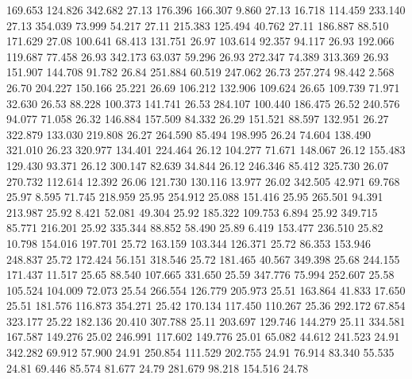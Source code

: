  169.653  124.826  342.682        27.13
 176.396  166.307    9.860        27.13
  16.718  114.459  233.140        27.13
 354.039   73.999   54.217        27.11
 215.383  125.494   40.762        27.11
 186.887   88.510  171.629        27.08
 100.641   68.413  131.751        26.97
 103.614   92.357   94.117        26.93
 192.066  119.687   77.458        26.93
 342.173   63.037   59.296        26.93
 272.347   74.389  313.369        26.93
 151.907  144.708   91.782        26.84
 251.884   60.519  247.062        26.73
 257.274   98.442    2.568        26.70
 204.227  150.166   25.221        26.69
 106.212  132.906  109.624        26.65
 109.739   71.971   32.630        26.53
  88.228  100.373  141.741        26.53
 284.107  100.440  186.475        26.52
 240.576   94.077   71.058        26.32
 146.884  157.509   84.332        26.29
 151.521   88.597  132.951        26.27
 322.879  133.030  219.808        26.27
 264.590   85.494  198.995        26.24
  74.604  138.490  321.010        26.23
 320.977  134.401  224.464        26.12
 104.277   71.671  148.067        26.12
 155.483  129.430   93.371        26.12
 300.147   82.639   34.844        26.12
 246.346   85.412  325.730        26.07
 270.732  112.614   12.392        26.06
 121.730  130.116   13.977        26.02
 342.505   42.971   69.768        25.97
   8.595   71.745  218.959        25.95
 254.912   25.088  151.416        25.95
 265.501   94.391  213.987        25.92
   8.421   52.081   49.304        25.92
 185.322  109.753    6.894        25.92
 349.715   85.771  216.201        25.92
 335.344   88.852   58.490        25.89
   6.419  153.477  236.510        25.82
  10.798  154.016  197.701        25.72
 163.159  103.344  126.371        25.72
  86.353  153.946  248.837        25.72
 172.424   56.151  318.546        25.72
 181.465   40.567  349.398        25.68
 244.155  171.437   11.517        25.65
  88.540  107.665  331.650        25.59
 347.776   75.994  252.607        25.58
 105.524  104.009   72.073        25.54
 266.554  126.779  205.973        25.51
 163.864   41.833   17.650        25.51
 181.576  116.873  354.271        25.42
 170.134  117.450  110.267        25.36
 292.172   67.854  323.177        25.22
 182.136   20.410  307.788        25.11
 203.697  129.746  144.279        25.11
 334.581  167.587  149.276        25.02
 246.991  117.602  149.776        25.01
  65.082   44.612  241.523        24.91
 342.282   69.912   57.900        24.91
 250.854  111.529  202.755        24.91
  76.914   83.340   55.535        24.81
  69.446   85.574   81.677        24.79
 281.679   98.218  154.516        24.78
